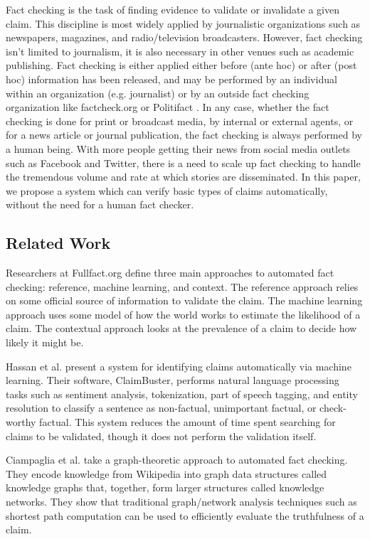 \documentclass{chi2009}
\begin{document}
Fact checking is the task of finding evidence to validate or invalidate a given claim. This discipline is most widely applied by journalistic organizations such as newspapers, magazines, and radio/television broadcasters.  However, fact checking isn't limited to journalism, it is also necessary in other venues such as academic publishing.  Fact checking is either applied either before (ante hoc) or after (post hoc) information has been released, and may be performed by an individual within an organization (e.g. journalist) or by an outside fact checking organization like factcheck.org \cite{factcheck} or Politifact \cite{politifact}.  In any case, whether the fact checking is done for print or broadcast media, by internal or external agents, or for a news article or journal publication, the fact checking is always performed by a human being.  With more people getting their news from social media outlets such as Facebook and Twitter, there is a need to scale up fact checking to handle the tremendous volume and rate at which stories are disseminated.  In this paper, we propose a system which can verify basic types of claims automatically, without the need for a human fact checker.

\subsection{Related Work}
Researchers at Fullfact.org \cite{babakar_moy_2016} define three main approaches to automated fact checking: reference, machine learning, and context.  The reference approach relies on some official source of information to validate the claim.  The machine learning approach uses some model of how the world works to estimate the likelihood of a claim.  The contextual approach looks at the prevalence of a claim to decide how likely it might be.

Hassan et al. \cite{hassan2015quest} present a system for identifying claims automatically via machine learning.  Their software, ClaimBuster, performs natural language processing tasks such as sentiment analysis, tokenization, part of speech tagging, and entity resolution to classify a sentence as non-factual, unimportant factual, or check-worthy factual.  This system reduces the amount of time spent searching for claims to be validated, though it does not perform the validation itself.  

Ciampaglia et al. \cite{ciampaglia2015computational} take a graph-theoretic approach to automated fact checking.  They encode knowledge from Wikipedia into graph data structures called knowledge graphs that, together, form larger structures called knowledge networks.  They show that traditional graph/network analysis techniques such as shortest path computation can be used to efficiently evaluate the truthfulness of a claim.
\end{document}
